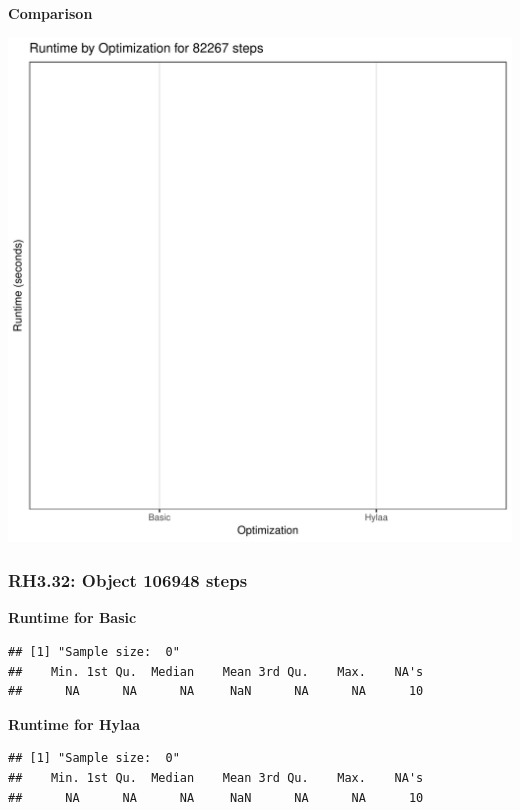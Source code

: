 \documentclass{article}\usepackage[]{graphicx}\usepackage[]{color}
\makeatletter
\def\maxwidth{ %
  \ifdim\Gin@nat@width>\linewidth
    \linewidth
  \else
    \Gin@nat@width
  \fi
}
\newenvironment{kframe}{%
 \def\at@end@of@kframe{}%
 \ifinner\ifhmode%
  \def\at@end@of@kframe{\end{minipage}}%
  \begin{minipage}{\columnwidth}%
 \fi\fi%
 \def\FrameCommand##1{\hskip\@totalleftmargin \hskip-\fboxsep
 \colorbox{shadecolor}{##1}\hskip-\fboxsep
     \hskip-\linewidth \hskip-\@totalleftmargin \hskip\columnwidth}%
 \MakeFramed {\advance\hsize-\width
   \@totalleftmargin\z@ \linewidth\hsize
   \@setminipage}}%
 {\par\unskip\endMakeFramed%
 \at@end@of@kframe}
\newenvironment{knitrout}{}{} %
\makeatother
\begin{document}
 \textbf{Comparison}
  
\begin{knitrout}
\color{fgcolor}
\includegraphics[width=\maxwidth]{figure/RH3_steps82267-1} 

\end{knitrout}


\subsubsection{RH3.32: Object 106948 steps}

 \textbf{Runtime for Basic}
\begin{knitrout}
\color{fgcolor}\begin{kframe}
\begin{verbatim}
## [1] "Sample size:  0"
##    Min. 1st Qu.  Median    Mean 3rd Qu.    Max.    NA's 
##      NA      NA      NA     NaN      NA      NA      10
\end{verbatim}
\end{kframe}
\end{knitrout}
 \textbf{Runtime for Hylaa}
\begin{knitrout}
\color{fgcolor}\begin{kframe}
\begin{verbatim}
## [1] "Sample size:  0"
##    Min. 1st Qu.  Median    Mean 3rd Qu.    Max.    NA's 
##      NA      NA      NA     NaN      NA      NA      10
\end{verbatim}
\end{kframe}
\end{knitrout}
  
\end{document}
